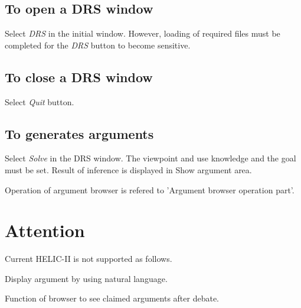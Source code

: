 \subsection{To open a DRS window}
Select {\sl DRS} in the initial window.
However, loading of required files must be completed for
 the {\sl DRS} button to become sensitive.

\subsection{To close a DRS window}
Select {\sl Quit} button.

\subsection{To generates arguments}

Select {\sl Solve} in the DRS window.
The viewpoint and use knowledge and the goal must be set.
Result of inference is displayed in Show argument area.

Operation of argument browser is refered to 'Argument browser operation part'.


\section{Attention}

Current HELIC-II is not supported as follows.

Display argument by using natural language.

Function of browser to see claimed arguments after debate.



